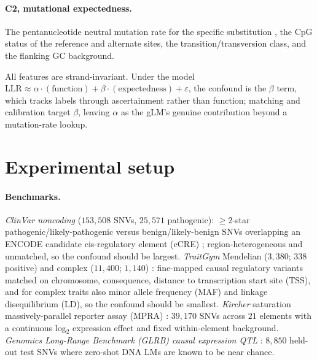 \documentclass[pmlr]{jmlr}
\begin{document}
\paragraph{C2, mutational expectedness.} The pentanucleotide neutral mutation rate for the
specific substitution \citep{carlson2018mutrate}, the CpG status of the reference and
alternate sites, the transition/transversion class, and the flanking GC background.

All features are strand-invariant. Under the model
$\mathrm{LLR}\approx\alpha\cdot(\text{function})+\beta\cdot(\text{expectedness})+\varepsilon$,
the confound is the $\beta$ term, which tracks labels through ascertainment rather than
function; matching and calibration target $\beta$, leaving $\alpha$ as the gLM's genuine
contribution beyond a mutation-rate lookup.

\section{Experimental setup}
\label{sec:setup}

\paragraph{Benchmarks.} \emph{ClinVar noncoding} ($153{,}508$ SNVs, $25{,}571$ pathogenic):
$\geq$2-star pathogenic/likely-pathogenic versus benign/likely-benign SNVs overlapping an
ENCODE candidate cis-regulatory element (cCRE) \citep{encode2020ccre}; region-heterogeneous
and unmatched, so the confound should be largest. \emph{TraitGym} Mendelian ($3{,}380$;
$338$ positive) and complex ($11{,}400$; $1{,}140$) \citep{benegas2025traitgym}: fine-mapped
causal regulatory variants matched on chromosome, consequence, distance to transcription
start site (TSS), and for complex traits also minor allele frequency (MAF) and linkage
disequilibrium (LD), so the confound should be smallest. \emph{Kircher} saturation
massively-parallel reporter assay (MPRA) \citep{kircher2019satmut}: $39{,}170$ SNVs across
$21$ elements with a continuous log$_2$ expression effect and fixed within-element
background. \emph{Genomics Long-Range Benchmark (GLRB) causal expression QTL}
\citep{glrb2024}: $8{,}850$ held-out test SNVs where zero-shot DNA LMs are known to be near
chance.
\end{document}
